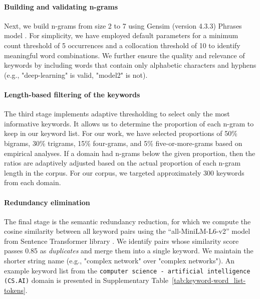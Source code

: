 \documentclass[10pt]{article}
\begin{document}
\paragraph{Building and validating n-grams} Next, we build n-grams from size 2 to 7 using Gensim (version 4.3.3) Phrases model \citep{vrehuuvrek2010software, mikolov2013distributed}. For simplicity, we have employed default parameters for a minimum count threshold of 5 occurrences and a collocation threshold of 10 to identify meaningful word combinations. We further ensure the quality and relevance of keywords by including words that contain only alphabetic characters and hyphens (e.g., "deep-learning" is valid, "model2" is not).

\paragraph{Length-based filtering of the keywords} The third stage implements adaptive thresholding to select only the most informative keywords. It allows us to determine the proportion of each n-gram to keep in our keyword list. For our work, we have selected proportions of 50\% bigrams, 30\% trigrams, 15\% four-grams, and 5\% five-or-more-grams based on empirical analyses. If a domain had n-grams below the given proportion, then the ratios are adaptively adjusted based on the actual proportion of each n-gram length in the corpus. For our corpus, we targeted approximately 300 keywords from each domain. 

\paragraph{Redundancy elimination} The final stage is the semantic redundancy reduction, for which we compute the cosine similarity between all keyword pairs using the ``all-MiniLM-L6-v2'' \citep{wang2020minilm} model from Sentence Transformer library \citep{reimers2019sentence}. We identify pairs whose similarity score passes 0.85 as \emph{duplicates} and merge them into a single keyword. We maintain the shorter string name (e.g., "complex network" over "complex networks"). An example keyword list from the \texttt{computer science - artificial intelligence (CS.AI)} domain is presented in Supplementary Table~\ref{tab:keyword-word_list-tokens}.
\end{document}
